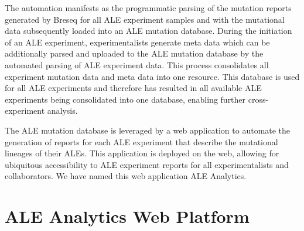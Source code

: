 \documentclass[12pt,final,masters,chapterheads]{ucsd}  %
\begin{document}
The automation manifests as the programmatic parsing of the mutation reports generated by Breseq for all ALE experiment samples and with the mutational data subsequently loaded into an ALE mutation database. During the initiation of an ALE experiment, experimentalists generate meta data which can be additionally parsed and uploaded to the ALE mutation database by the automated parsing of ALE experiment data. This process consolidates all experiment mutation data and meta data into one resource. This database is used for all ALE experiments and therefore has resulted in all available ALE experiments being consolidated into one database, enabling further cross-experiment analysis.

The ALE mutation database is leveraged by a web application to automate the generation of reports for each ALE experiment that describe the mutational lineages of their ALEs. This application is deployed on the web, allowing for ubiquitous accessibility to ALE experiment reports for all experimentalists and collaborators. We have named this web application ALE Analytics.

\section{ALE Analytics Web Platform}

%
%
\end{document}
